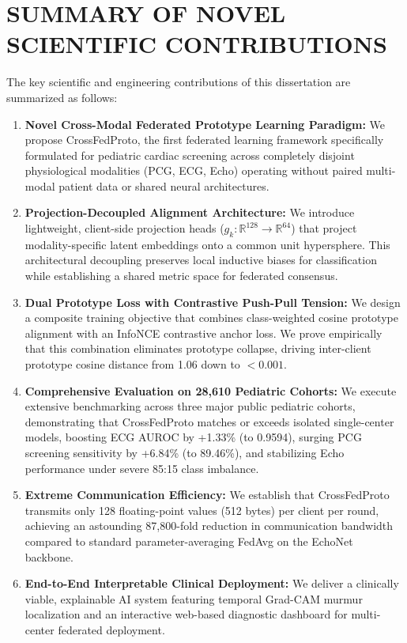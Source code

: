 \documentclass[12pt,a4paper]{amritareport}
\begin{document}
\section{SUMMARY OF NOVEL SCIENTIFIC CONTRIBUTIONS}

The key scientific and engineering contributions of this dissertation are summarized as follows:
\begin{enumerate}
	\item \textbf{Novel Cross-Modal Federated Prototype Learning Paradigm:} We propose CrossFedProto, the first federated learning framework specifically formulated for pediatric cardiac screening across completely disjoint physiological modalities (PCG, ECG, Echo) operating without paired multi-modal patient data or shared neural architectures.
	\item \textbf{Projection-Decoupled Alignment Architecture:} We introduce lightweight, client-side projection heads ($g_k: \mathbb{R}^{128} \rightarrow \mathbb{R}^{64}$) that project modality-specific latent embeddings onto a common unit hypersphere. This architectural decoupling preserves local inductive biases for classification while establishing a shared metric space for federated consensus.
	\item \textbf{Dual Prototype Loss with Contrastive Push-Pull Tension:} We design a composite training objective that combines class-weighted cosine prototype alignment with an InfoNCE contrastive anchor loss. We prove empirically that this combination eliminates prototype collapse, driving inter-client prototype cosine distance from 1.06 down to $< 0.001$.
	\item \textbf{Comprehensive Evaluation on 28,610 Pediatric Cohorts:} We execute extensive benchmarking across three major public pediatric cohorts, demonstrating that CrossFedProto matches or exceeds isolated single-center models, boosting ECG AUROC by +1.33\% (to 0.9594), surging PCG screening sensitivity by +6.84\% (to 89.46\%), and stabilizing Echo performance under severe 85:15 class imbalance.
	\item \textbf{Extreme Communication Efficiency:} We establish that CrossFedProto transmits only 128 floating-point values (512 bytes) per client per round, achieving an astounding 87,800-fold reduction in communication bandwidth compared to standard parameter-averaging FedAvg on the EchoNet backbone.
	\item \textbf{End-to-End Interpretable Clinical Deployment:} We deliver a clinically viable, explainable AI system featuring temporal Grad-CAM murmur localization and an interactive web-based diagnostic dashboard for multi-center federated deployment.
\end{enumerate}
\end{document}

